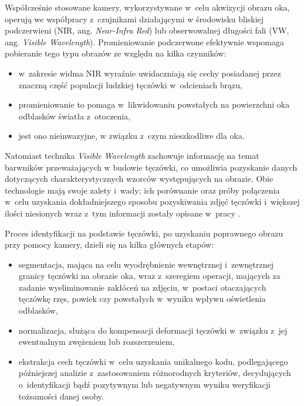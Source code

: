 Współcześnie stosowane kamery, wykorzystywane w~celu akwizycji obrazu oka, operują we współpracy z~czujnikami działającymi w środowisku bliskiej podczerwieni (NIR, ang. \emph{Near-Infra Red}) lub obserwowalnej długości fali (VW, ang. \emph{Visible Wavelength}). Promieniowanie podczerwone efektywnie wspomaga pobieranie tego typu obrazów ze względu na kilka czynników:
\begin{itemize} 
\item w~zakresie widma NIR wyraźnie uwidaczniają się cechy posiadanej przez znaczną część populacji ludzkiej tęczówki w~odcieniach brązu,
\item promieniowanie to pomaga w~likwidowaniu powstałych na powierzchni oka odblasków światła z~otoczenia,
\item jest ono nieinwazyjne, w związku z~czym nieszkodliwe dla oka.
\end{itemize}
Natomiast technika \emph{Visible Wavelength} zachowuje informację na temat barwników przeważających w budowie tęczówki, co umożliwia pozyskanie danych dotyczących charakterystycznych wzorców występujących na obrazie. Obie technologie mają swoje zalety i~wady; ich porównanie oraz próby połączenia w~celu uzyskania dokładniejszego sposobu pozyskiwania zdjęć tęczówki i~większej ilości niesionych wraz z~tym informacji zostały opisane w~pracy \cite{Hos10}. 

Proces identyfikacji na podstawie tęczówki, po uzyskaniu poprawnego obrazu przy pomocy kamery, dzieli się na kilka głównych etapów: \begin{itemize}
\item segmentacja, mająca na celu wyodrębnienie wewnętrznej i~zewnętrznej granicy tęczówki na obrazie oka, wraz z~szeregiem operacji, mających za zadanie wyeliminowanie zakłóceń na zdjęciu, w~postaci otaczających tęczówkę rzęs, powiek czy powstałych w~wyniku wpływu oświetlenia odblasków,
\item normalizacja, służąca do kompensacji deformacji tęczówki w~związku z~jej ewentualnym zwężeniem lub rozszerzeniem,
\item ekstrakcja cech tęczówki w~celu uzyskania unikalnego kodu, podlegającego późniejszej analizie z~zastosowaniem różnorodnych kryteriów, decydujących o~identyfikacji bądź pozytywnym lub negatywnym wyniku weryfikacji tożsamości danej osoby.
\end{itemize}

